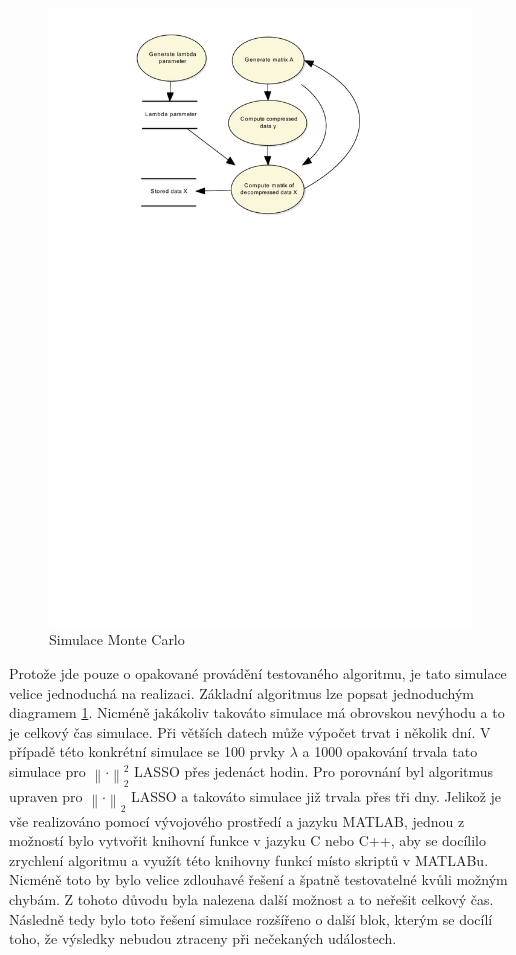 \documentclass[FM,BP]{tulthesis}
\begin{document}
\begin{figure}[!ht]
	\begin{center}
		\includegraphics[scale=0.8]{obr/mcsim.pdf}
	\end{center}
	\caption{Simulace Monte Carlo}
	\label{fig:mcSim}
\end{figure}

Protože jde pouze o opakované provádění testovaného algoritmu, je tato simulace velice jednoduchá na realizaci. Základní algoritmus lze popsat jednoduchým diagramem \ref{fig:mcSim}. Nicméně jakákoliv takováto simulace má obrovskou nevýhodu a to je celkový čas simulace. Při větších datech může výpočet trvat i několik dní. V případě této konkrétní simulace se 100 prvky $\lambda$ a 1000 opakování trvala tato simulace pro $\left\| \cdot\right\|_{2}^{2} $ LASSO přes jedenáct hodin. Pro porovnání byl algoritmus upraven pro $\left\| \cdot \right\|_2 $ LASSO a takováto simulace již trvala přes tři dny. Jelikož je vše realizováno pomocí vývojového prostředí a jazyku MATLAB, jednou z možností bylo vytvořit knihovní funkce v jazyku C nebo C++, aby se docílilo zrychlení algoritmu a využít této knihovny funkcí místo skriptů v MATLABu. Nicméně toto by bylo velice zdlouhavé řešení a špatně testovatelné kvůli možným chybám. Z tohoto důvodu byla nalezena další možnost a to neřešit celkový čas. Následně tedy bylo toto řešení simulace rozšířeno o další blok, kterým se docílí toho, že výsledky nebudou ztraceny při nečekaných událostech.
\end{document}
